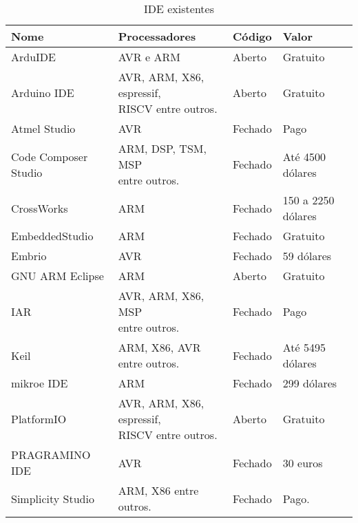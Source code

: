 \begin{table}[]
\centering
\caption{IDE existentes}
\label{ides}
\begin{tabular}{@{}llll@{}}
\toprule
Nome                  & Processadores                                          & Código  & Valor              \\ \midrule
ArduIDE               & AVR e ARM                                     & Aberto  & Gratuito           \\
Arduino IDE           & \makecell[l]{AVR, ARM, X86, espressif,\\RISCV entre outros.} & Aberto  & Gratuito           \\
Atmel Studio          & AVR                                           & Fechado & Pago               \\
Code Composer Studio  & \makecell[l]{ARM, DSP, TSM,  MSP\\entre outros.}                      & Fechado & Até 4500 dólares   \\
CrossWorks            & ARM                                                    & Fechado & 150 a 2250 dólares \\
EmbeddedStudio        & ARM                                                    & Fechado & Gratuito           \\
Embrio                & AVR                                                    & Fechado & 59 dólares         \\
GNU ARM Eclipse       & ARM                                                    & Aberto  & Gratuito           \\
IAR                   & \makecell[l]{AVR, ARM, X86,  MSP\\entre outros.}                      & Fechado & Pago  \\
Keil                  & \makecell[l]{ARM, X86, AVR\\entre outros.}                            & Fechado & Até 5495 dólares   \\
mikroe IDE            & ARM                                                    & Fechado & 299 dólares        \\
PlatformIO            & \makecell[l]{AVR, ARM, X86, espressif,\\RISCV entre outros.} & Aberto  & Gratuito           \\
PRAGRAMINO IDE        & AVR                                           & Fechado & 30 euros           \\
Simplicity Studio     & ARM, X86 entre outros.                                 & Fechado & Pago.              \\ \bottomrule
\end{tabular}
\end{table}

